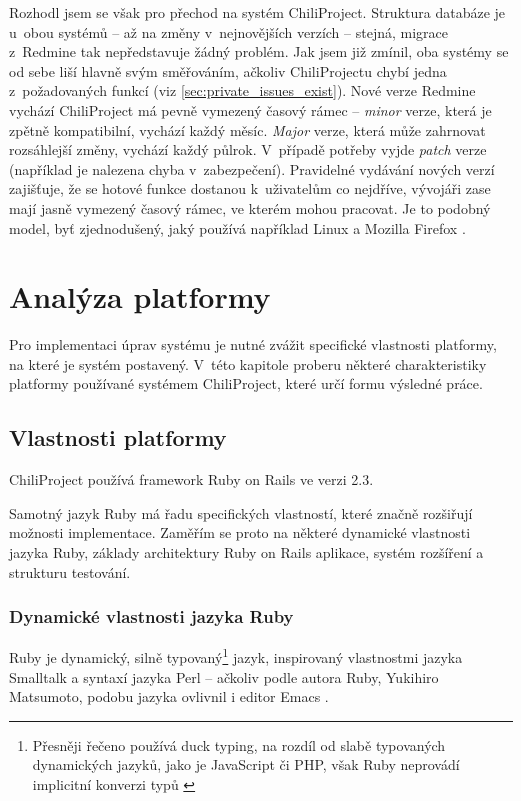 \documentclass[thesis=B,czech]{FITthesis}[2012/05/02]
\begin{document}
Rozhodl jsem se však pro přechod na systém ChiliProject. Struktura databáze
je u~obou systémů -- až na změny v~nejnovějších verzích -- stejná,
migrace z~Redmine tak nepředstavuje žádný problém. Jak jsem již zmínil,
oba systémy se od sebe liší hlavně svým směřováním, ačkoliv
ChiliProjectu chybí jedna z~požadovaných funkcí
(viz \ref{sec:private_issues_exist}). Nové verze Redmine vychází
 ChiliProject má pevně vymezený časový rámec
-- \emph{minor} verze, která je zpětně kompatibilní,
vychází každý měsíc. \emph{Major} verze, která může zahrnovat rozsáhlejší změny,
vychází každý půlrok. V~případě potřeby vyjde \emph{patch} verze (například je nalezena chyba v~zabezpečení).
Pravidelné vydávání nových verzí zajišťuje, že se hotové funkce dostanou
k~uživatelům co nejdříve, vývojáři zase mají jasně vymezený časový
rámec, ve kterém mohou pracovat. Je to podobný model, byť zjednodušený,
jaký používá například Linux a Mozilla Firefox
\citep{MozillaDevProcess}.

\chapter{Analýza platformy}
\label{chap:analyza_navrh}

Pro implementaci úprav systému je nutné zvážit specifické vlastnosti
platformy, na které je systém postavený. V~této kapitole proberu některé
charakteristiky platformy používané systémem ChiliProject, které určí
formu výsledné práce.

\section{Vlastnosti platformy}

ChiliProject používá framework Ruby on Rails ve verzi 2.3.

Samotný jazyk Ruby má řadu specifických vlastností, které značně
rozšiřují možnosti implementace. Zaměřím se proto na některé dynamické
vlastnosti jazyka Ruby, základy architektury Ruby on Rails aplikace,
systém rozšíření a strukturu testování.

\subsection{Dynamické vlastnosti jazyka Ruby}
\label{sec:vlastnosti-ruby}

Ruby je dynamický, silně typovaný\footnote{Přesněji řečeno používá
  \gls{duck typing}, na rozdíl od slabě typovaných dynamických jazyků,
  jako je JavaScript či PHP, však Ruby neprovádí implicitní konverzi typů
  \citep{Lamontagne2007}} jazyk, inspirovaný vlastnostmi jazyka
Smalltalk a syntaxí jazyka Perl \citep{Stewart2001} -- ačkoliv podle
autora Ruby, Yukihiro  Matsumoto, podobu jazyka ovlivnil i editor
Emacs \citep{Matsumoto2012}.
\end{document}
